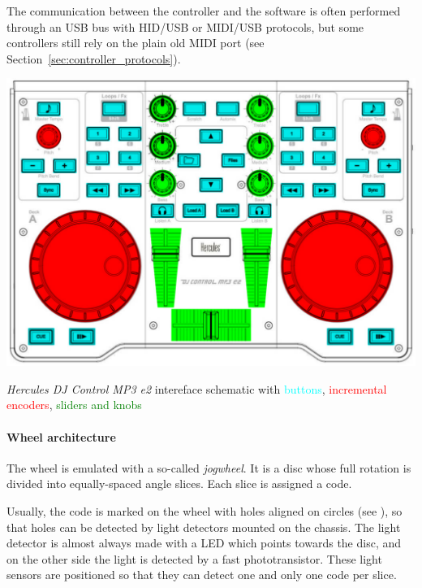\documentclass[a4paper,10pt]{article}
\makeatletter
\newenvironment{figurehere}{\def\@captype{figure}\vspace{2ex}}{\vspace{2ex}}
\makeatother
\begin{document}
\begin{multicols}{2}
The communication between the controller and the software is often performed
through an USB bus with HID/USB or MIDI/USB protocols, but some controllers
still rely on the plain old MIDI port (see Section~\ref{sec:controller_protocols}).

\begin{figurehere}
	\centering
	\includegraphics[keepaspectratio=true,width=\columnwidth]{images/hercules_mp3e2_schematic.pdf}
	\caption{\emph{Hercules DJ Control MP3 e2} \cite{hercules_djcmp3e2}
	intereface schematic with \textcolor{cyan}{buttons}, \textcolor{red}{incremental encoders},
	\textcolor{green}{sliders and knobs}}
	\label{fig:hercules_mp3e2_schematic}
\end{figurehere}


\paragraph{Wheel architecture}
The wheel is emulated with a so-called \emph{jogwheel}. It is a disc whose
full rotation is divided into equally-spaced angle slices. Each slice is
assigned a code.

Usually, the code is marked on the wheel with holes aligned on circles (see
), so that holes can be detected by light detectors
mounted on the chassis. The light detector is almost always made with a LED
which points towards the disc, and on the other side the light is detected by
a fast phototransistor. These light sensors are positioned so that they can
detect one and only one code per slice.


\end{multicols}
\end{document}
